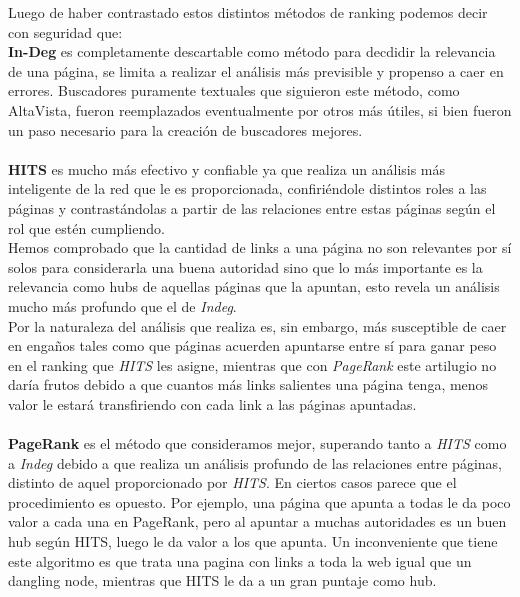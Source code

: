 \documentclass[a4paper]{article}
\begin{document}
Luego de haber contrastado estos distintos métodos de ranking podemos decir con seguridad que:\\


\textbf{In-Deg} es completamente descartable como método para decdidir la relevancia de una página, se limita a realizar el análisis más previsible y propenso a caer en errores.
Buscadores puramente textuales que siguieron este método, como AltaVista, fueron reemplazados eventualmente por otros más útiles, si bien fueron un paso necesario para la creación de buscadores mejores.\\\\

\textbf{HITS} es mucho más efectivo y confiable ya que realiza un análisis más inteligente de la red que le es proporcionada, confiriéndole distintos roles a las páginas y contrastándolas a partir de las relaciones entre estas páginas según el rol que estén cumpliendo.\\
Hemos comprobado que la cantidad de links a una página no son relevantes por sí solos para considerarla una buena autoridad sino que lo más importante es la relevancia como hubs de aquellas páginas que la apuntan, esto revela un análisis mucho más profundo que el de \textit{Indeg}.\\
Por la naturaleza del análisis que realiza es, sin embargo, más susceptible de caer en engaños tales como que páginas acuerden apuntarse entre sí para ganar peso en el ranking que \textit{HITS} les asigne, mientras que con \textit{PageRank} este artilugio no daría frutos debido a que cuantos más links salientes una página tenga, menos valor le estará transfiriendo con cada link a las páginas apuntadas.\\\\

\textbf{PageRank} es el método que consideramos mejor, superando tanto a \textit{HITS} como a \textit{Indeg} debido a que realiza un análisis profundo de las relaciones entre páginas, distinto de aquel proporcionado por \textit{HITS}. En ciertos casos parece que el procedimiento es opuesto. Por ejemplo, una página que apunta a todas le da poco valor a cada una en PageRank, pero al apuntar a muchas autoridades es un buen hub según HITS, luego le da valor a los que apunta. Un inconveniente que tiene este algoritmo es que trata una pagina con links a toda la web igual que un dangling node, mientras que HITS le da a un gran puntaje como hub.
\\\\
\end{document}
